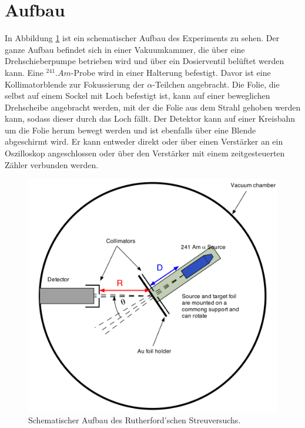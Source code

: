 \section{Aufbau}
\label{sec:Aufbau}

In Abbildung \ref{fig:Aufbau} ist ein schematischer Aufbau des Experiments zu sehen.
Der ganze Aufbau befindet sich in einer Vakuumkammer, die über eine Drehschieberpumpe betrieben wird und über ein Dosierventil belüftet werden kann.
Eine $^{241}.{Am}$-Probe wird in einer Halterung befestigt. Davor ist eine Kollimatorblende zur Fokussierung der $\alpha$-Teilchen angebracht.
Die Folie, die selbst auf einem Sockel mit Loch befestigt ist, kann auf einer beweglichen Drehscheibe angebracht werden, mit der die Folie aus dem Strahl gehoben werden kann, sodass dieser durch das Loch fällt.
Der Detektor kann auf einer Kreisbahn um die Folie herum bewegt werden und ist ebenfalls über eine Blende abgeschirmt wird.
Er kann entweder direkt oder über einen Verstärker an ein Oszilloskop angeschlossen oder über den Verstärker mit einem zeitgesteuerten Zähler verbunden werden.

\begin{figure}
\centering
\includegraphics[width=\linewidth-70pt,keepaspectratio]{content/images/Aufbau.pdf}
\caption{Schematischer Aufbau des Rutherford'schen Streuversuchs.\cite{Aufbau16}}
\label{fig:Aufbau}
\end{figure}
